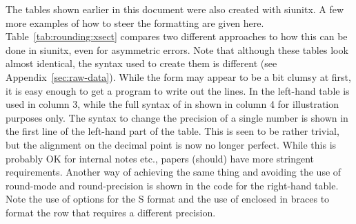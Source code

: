 \documentclass[UKenglish,texlive=2016]{\ATLASLATEXPATH atlasdoc}
\begin{document}
The tables shown earlier in this document were also created with \textsf{siunitx}.
A few more examples of how to steer the formatting are given here.
Table~\ref{tab:rounding:xsect} compares two different approaches
to how this can be done  in \textsf{siunitx}, even for asymmetric errors.  Note that although these
tables look almost identical, the syntax used to create them is different (see Appendix~\ref{sec:raw-data}).
While the form may appear to be a bit clumsy at first, it is easy enough to get a
program to write out the lines. In the left-hand table
 is used in column 3, while the full syntax of 
in shown in column 4 for illustration purposes only.  The syntax
to change the precision of a single number is shown in the first line of
the left-hand part of the table. This is seen to be rather
trivial, but the alignment on the decimal point is now no longer
perfect. While this is probably OK for internal notes etc., papers
(should) have more stringent requirements. Another way of achieving
the same thing and avoiding the use of \textsf{round-mode} and
\textsf{round-precision} is shown in the code for the right-hand table. Note the
use of options for the \textsf{S} format and the use of  enclosed
in braces to format the row that requires a different precision.
\end{document}
